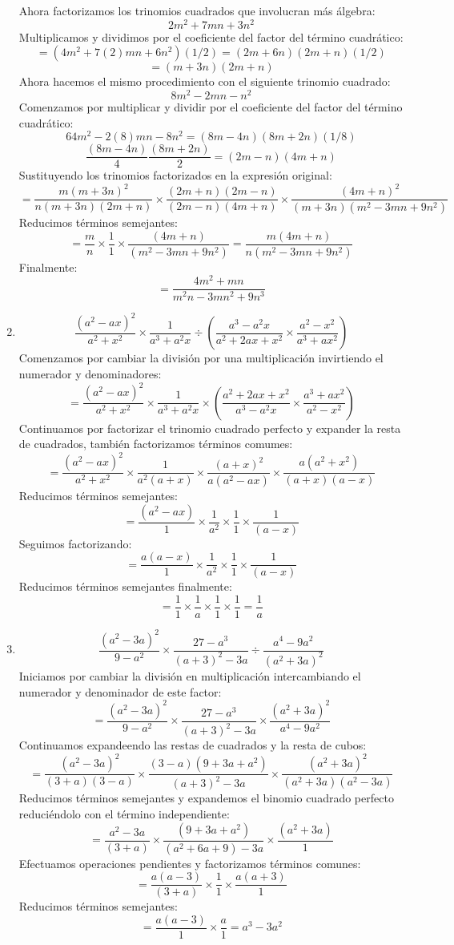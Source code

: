 \documentclass[12pt]{article}
\begin{document}
\begin{enumerate}[label=\bfseries Ejercicio \arabic*:]
Ahora factorizamos los trinomios cuadrados que involucran más álgebra:
$$2m^2 + 7mn + 3n^2$$
Multiplicamos y dividimos por el coeficiente del factor del término cuadrático:
$$= (4m^2 + 7(2)mn + 6n^2)(1/2) = (2m + 6n)(2m + n)(1/2)$$
$$= (m + 3n)(2m + n)$$
Ahora hacemos el mismo procedimiento con el siguiente trinomio cuadrado:
$$8m^2 - 2mn - n^2$$
Comenzamos por multiplicar y dividir por el coeficiente del factor del término cuadrático:
$$64m^2 - 2(8)mn - 8n^2 = (8m - 4n)(8m + 2n)(1/8)$$
$$\frac{(8m - 4n)}{4} \frac{(8m + 2n)}{2} = (2m - n)(4m + n)$$
Sustituyendo los trinomios factorizados en la expresión original:
$$= \frac{m(m + 3n)^2}{n(m + 3n)(2m + n)} \times \frac{(2m + n)(2m - n)}{(2m - n)(4m + n)} \times \frac{(4m + n)^2}{(m + 3n)(m^2 - 3mn + 9n^2)}$$
Reducimos términos semejantes:
$$= \frac{m}{n} \times \frac{1}{1} \times \frac{(4m + n)}{(m^2 - 3mn + 9n^2)} = \frac{m(4m + n)}{n(m^2 - 3mn + 9n^2)}$$
Finalmente:
$$= \frac{4m^2 + mn}{m^2n - 3mn^2 + 9n^3}$$
  \item $$\frac{(a^2 - ax)^2}{a^2 + x^2} \times \frac{1}{a^3 + a^2x} \div \left( \frac{a^3 - a^2x}{a^2 + 2ax + x^2} \times \frac{a^2 - x^2}{a^3 + ax^2} \right)$$
Comenzamos por cambiar la división por una multiplicación invirtiendo el numerador y denominadores:
$$= \frac{(a^2 - ax)^2}{a^2 + x^2} \times \frac{1}{a^3 + a^2x} \times \left( \frac{a^2 + 2ax + x^2}{a^3 - a^2x} \times \frac{a^3 + ax^2}{a^2 - x^2} \right)$$
Continuamos por factorizar el trinomio cuadrado perfecto y expander la resta de cuadrados, también factorizamos términos comumes:
$$= \frac{(a^2 - ax)^2}{a^2 + x^2} \times \frac{1}{a^2(a + x)} \times \frac{(a + x)^2}{a(a^2 - ax)} \times \frac{a(a^2 + x^2)}{(a + x)(a - x)}$$
Reducimos términos semejantes:
$$= \frac{(a^2 - ax)}{1} \times \frac{1}{a^2} \times \frac{1}{1} \times \frac{1}{(a - x)}$$
Seguimos factorizando:
$$= \frac{a(a - x)}{1} \times \frac{1}{a^2} \times \frac{1}{1} \times \frac{1}{(a - x)}$$
Reducimos términos semejantes finalmente:
$$= \frac{1}{1} \times \frac{1}{a} \times \frac{1}{1} \times \frac{1}{1} = \frac{1}{a}$$
  \item $$\frac{(a^2 - 3a)^2}{9 - a^2} \times \frac{27 - a^3}{(a + 3)^2 - 3a} \div \frac{a^4 - 9a^2}{(a^2 + 3a)^2}$$
Iniciamos por cambiar la división en multiplicación intercambiando el numerador y denominador de este factor:
$$= \frac{(a^2 - 3a)^2}{9 - a^2} \times \frac{27 - a^3}{(a + 3)^2 - 3a} \times \frac{(a^2 + 3a)^2}{a^4 - 9a^2}$$
Continuamos expandeendo las restas de cuadrados y la resta de cubos:
$$= \frac{(a^2 - 3a)^2}{(3 + a)(3 - a)} \times \frac{(3 - a)(9 +3a + a^2)}{(a + 3)^2 - 3a} \times \frac{(a^2 + 3a)^2}{(a^2 + 3a)(a^2 - 3a)}$$
Reducimos términos semejantes y expandemos el binomio cuadrado perfecto reduciéndolo con el término independiente:
$$= \frac{a^2 - 3a}{(3 + a)} \times \frac{(9 +3a + a^2)}{(a^2 +6a + 9) - 3a} \times \frac{(a^2 + 3a)}{1}$$
Efectuamos operaciones pendientes y factorizamos términos comunes:
$$= \frac{a(a - 3)}{(3 + a)} \times \frac{1}{1} \times \frac{a(a + 3)}{1}$$
Reducimos términos semejantes:
$$= \frac{a(a - 3)}{1} \times \frac{a}{1} = a^3 - 3a^2$$
\end{enumerate}
\end{document}
